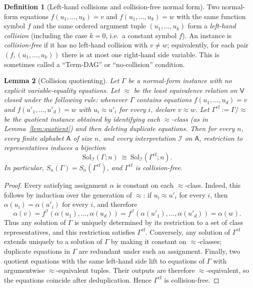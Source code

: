 \documentclass[11pt]{article}
\theoremstyle{definition}
\newtheorem{definition}{Definition}[section]
\theoremstyle{plain}
\newtheorem{lemma}[definition]{Lemma}
\newcommand{\A}{\mathsf{A}}
\newcommand{\Vars}{\mathsf{V}}
\newcommand{\Sol}{\mathrm{Sol}}
\newcommand{\Sn}{S_n}
\begin{document}
\begin{definition}[Left-hand collisions and collision-free normal form]
\label{def:collisionfree}
Two normal-form equations
\(f(u_1,\dots,u_k)=v\) and \(f(u_1,\dots,u_k)=w\) with the same function symbol $f$ and the same ordered
argument tuple $(u_1,\dots,u_k)$ form a \emph{left-hand collision} (including the case $k=0$, i.e.\ a constant
symbol $f$).
An instance is \emph{collision-free} if it has no left-hand collision with $v\neq w$; equivalently, for each
pair $(f,(u_1,\dots,u_k))$ there is at most one right-hand side variable.
This is sometimes called a ``Term-DAG'' or ``no-collision'' condition.
\end{definition}

\begin{lemma}[Collision quotienting]
\label{lem:collision-quotient}
Let $\Gamma$ be a normal-form instance with no explicit variable-equality equations.
Let $\approx$ be the least equivalence relation on $\Vars$ closed under the following rule:
whenever $\Gamma$ contains equations
$f(u_1,\dots,u_d)=v$ and $f(u'_1,\dots,u'_d)=w$ with $u_i\approx u'_i$ for every $i$, declare
$v\approx w$.
Let $\Gamma^{\mathrm{cf}}:=\Gamma/\!\approx$ be the quotient instance obtained by identifying each
$\approx$-class (as in Lemma~\ref{lem:quotient}) and then deleting duplicate equations.
Then for every $n$, every finite alphabet $\A$ of size $n$, and every interpretation $\mathcal I$ on $\A$,
restriction to representatives induces a
bijection
\[\Sol_{\mathcal I}(\Gamma;n)\ \cong\ \Sol_{\mathcal I}(\Gamma^{\mathrm{cf}};n).\]
In particular, $\Sn(\Gamma)=\Sn(\Gamma^{\mathrm{cf}})$, and $\Gamma^{\mathrm{cf}}$ is collision-free.
\end{lemma}

\begin{proof}
Every satisfying assignment $\alpha$ is constant on each $\approx$-class.  Indeed, this follows by induction
over the generation of $\approx$: if $u_i\approx u'_i$ for every $i$, then
$\alpha(u_i)=\alpha(u'_i)$ for every $i$, and therefore
\[
\alpha(v)=f^{\mathcal I}(\alpha(u_1),\dots,\alpha(u_d))
=f^{\mathcal I}(\alpha(u'_1),\dots,\alpha(u'_d))=\alpha(w).
\]
Thus any solution of $\Gamma$ is uniquely determined by its restriction to a set of class representatives, and
this restriction satisfies $\Gamma^{\mathrm{cf}}$.
Conversely, any solution of $\Gamma^{\mathrm{cf}}$ extends uniquely to a solution of $\Gamma$ by making it
constant on $\approx$-classes; duplicate equations in $\Gamma$ are redundant under such an assignment.
Finally, two quotient equations with the same left-hand side lift to equations of $\Gamma$ with
argumentwise $\approx$-equivalent tuples.  Their outputs are therefore $\approx$-equivalent, so the equations
coincide after deduplication.  Hence $\Gamma^{\mathrm{cf}}$ is collision-free.
\end{proof}
\end{document}
